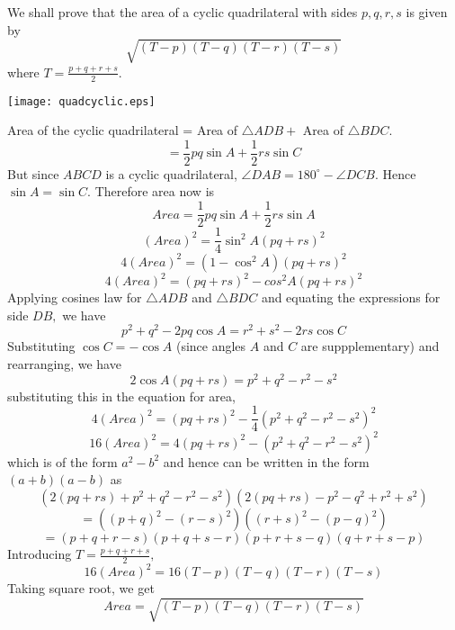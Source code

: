 \documentclass[12pt]{article}
\begin{document}
We shall prove that the area of a cyclic quadrilateral with sides $p,q,r,s$  is given by $$\sqrt{(T-p)(T-q)(T-r)(T-s)}$$where $T = \frac{p+q+r+s}{2}.$

\begin{center}
\texttt{[image: quadcyclic.eps]}
\end{center}

Area of the cyclic quadrilateral = Area of $\triangle ADB +$ Area of $\triangle BDC.$ $$ = \frac{1}{2}pq\sin A  + \frac{1}{2}rs\sin C$$
But since $ABCD$ is a cyclic quadrilateral, $\angle DAB = 180^\circ - \angle DCB.$
Hence $\sin A = \sin C.$ Therefore area now is
$$ Area = \frac{1}{2}pq\sin A + \frac{1}{2}rs\sin A$$
$$ (Area)^2 = \frac{1}{4}\sin^2 A (pq + rs)^2$$
$$ 4(Area)^2 = (1 - \cos^2 A)(pq + rs)^2$$
$$ 4(Area)^2 = (pq + rs)^2 - cos^2 A (pq + rs)^2$$
Applying cosines law for $\triangle ADB$ and $\triangle BDC$ and equating the expressions for side $DB,$ we have
$$p^2 + q^2 - 2pq\cos A = r^2 + s^2 - 2rs\cos C$$
Substituting $\cos C = -\cos A$ (since angles $A$ and $C$ are suppplementary) and rearranging, we have
$$2\cos A (pq + rs) = p^2 + q^2 - r^2 - s^2$$
substituting this in the equation for area,
$$ 4(Area)^2 = (pq + rs)^2 - \frac{1}{4}(p^2 + q^2 - r^2 - s^2)^2$$
$$ 16(Area)^2 = 4(pq + rs)^2 - (p^2 + q^2 - r^2 - s^2)^2$$
which is of the form $a^2-b^2$ and hence can be written in the form $(a+b)(a-b)$ as
$$(2(pq + rs) + p^2 + q^2 -r^2 - s^2)(2(pq + rs) - p^2 - q^2 + r^2 +s^2)$$
$$ = ( (p+q)^2 - (r-s)^2 )( (r+s)^2 - (p-q)^2 )        $$
$$ = (p+q+r-s)(p+q+s-r)(p+r+s-q)(q+r+s-p)$$
Introducing $T = \frac{p+q+r+s}{2},$
$$ 16(Area)^2 = 16(T-p)(T-q)(T-r)(T-s)$$
Taking square root, we get
$$ Area = \sqrt{(T-p)(T-q)(T-r)(T-s)}$$
\end{document}
